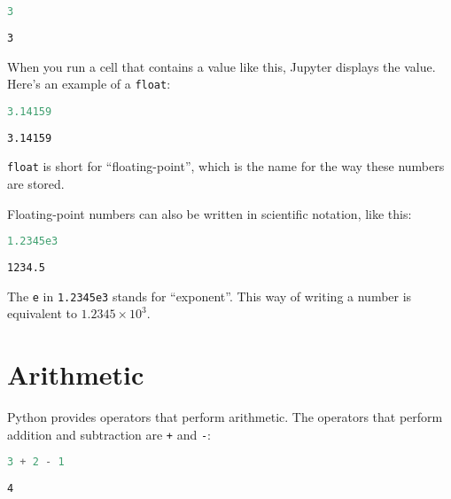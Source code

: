\begin{lstlisting}[language=Python,style=source]
3
\end{lstlisting}

\begin{lstlisting}[style=output]
3
\end{lstlisting}

When you run a cell that contains a value like this, Jupyter displays
the value. Here's an example of a \passthrough{\lstinline!float!}:

\begin{lstlisting}[language=Python,style=source]
3.14159
\end{lstlisting}

\begin{lstlisting}[style=output]
3.14159
\end{lstlisting}

\passthrough{\lstinline!float!} is short for ``floating-point'', which
is the name for the way these numbers are stored.

Floating-point numbers can also be written in scientific notation, like
this:

\begin{lstlisting}[language=Python,style=source]
1.2345e3
\end{lstlisting}

\begin{lstlisting}[style=output]
1234.5
\end{lstlisting}

The \passthrough{\lstinline!e!} in \passthrough{\lstinline!1.2345e3!}
stands for ``exponent''. This way of writing a number is equivalent to
\(1.2345 \times 10^{3}\).

\hypertarget{arithmetic}{%
\section{Arithmetic}\label{arithmetic}}

Python provides operators that perform arithmetic. The operators that
perform addition and subtraction are \passthrough{\lstinline!+!} and
\passthrough{\lstinline!-!}:

\begin{lstlisting}[language=Python,style=source]
3 + 2 - 1
\end{lstlisting}

\begin{lstlisting}[style=output]
4
\end{lstlisting}

